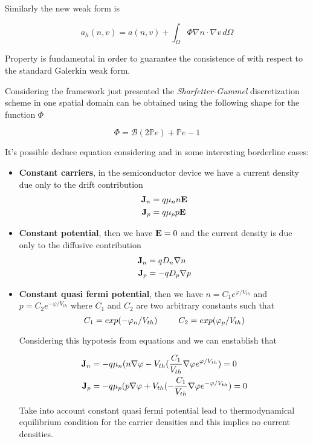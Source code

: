 Similarly the new weak form is

\begin{equation}
\label{eq: weak form perturbed}
a_h(n,v) = a(n,v) + \int_{\Omega} \Phi \nabla n \cdot \nabla v \, d\Omega
\end{equation}

Property  is fundamental in order to guarantee the consistence of  with respect to the standard Galerkin weak form.

Considering the framework just presented the \textit{Sharfetter-Gummel} discretization scheme in one spatial domain can be obtained using the following shape for the function $\Phi$

\begin{equation}
\label{eq: phi per SG 1D}
\Phi = \mathcal{B}(2\mathbb{P}e) + \mathbb{P}e -1
\end{equation}

It's possible deduce equation  
considering  and  in some interesting borderline cases:
\begin{itemize}
\item \textbf{Constant carriers}, in the semiconductor device we have  a current density due only to the drift contribution
\begin{align*}
\mathbf{J}_n & = q\mu_n n \mathbf{E} \\
\mathbf{J}_p & = q\mu_p p \mathbf{E}
\end{align*}
\item \textbf{Constant potential}, then we have $\mathbf{E}=0$ and the current density is due only to the diffusive contribution
\begin{align*}
\mathbf{J}_n & = qD_n\nabla n \\
\mathbf{J}_p & = -qD_p\nabla p
\end{align*}
\item \textbf{Constant quasi fermi potential}, then we have $n=C_1e^{\varphi / V_{th}}$ and $p=C_2e^{-\varphi / V_{th}}$ where $C_1$ and $C_2$ are two arbitrary constants such that
\begin{equation*}
C_1 = exp(-\varphi_n/V_{th}) \psp{15} C_2 = exp(\varphi_p/V_{th})
\end{equation*}

Considering this hypotesis from equations  and  we can enstablish that

\begin{align*}
\mathbf{J}_n & = -q\mu_n (n\nabla 	\varphi - V_{th} (\dfrac{C_1}{V_{th}}\nabla \varphi e^{\varphi / V_{th}}) = 0\\
\mathbf{J}_p & = -q\mu_p (p\nabla 	\varphi + V_{th} (-\dfrac{C_1}{V_{th}}\nabla \varphi e^{-\varphi / V_{th}}) = 0
\end{align*}

Take into account constant quasi fermi potential lead to thermodynamical equilibrium condition for the carrier densities and this implies no current densities.
\end{itemize}



